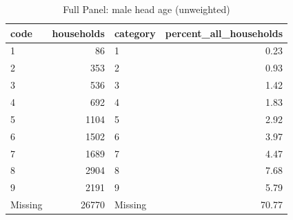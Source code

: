 \begin{table}
\caption{Full Panel: male head age (unweighted)}
\begin{tabular}{lrlr}
\toprule
code & households & category & percent\_all\_households \\
\midrule
1 & 86 & 1 & 0.23 \\
2 & 353 & 2 & 0.93 \\
3 & 536 & 3 & 1.42 \\
4 & 692 & 4 & 1.83 \\
5 & 1104 & 5 & 2.92 \\
6 & 1502 & 6 & 3.97 \\
7 & 1689 & 7 & 4.47 \\
8 & 2904 & 8 & 7.68 \\
9 & 2191 & 9 & 5.79 \\
Missing & 26770 & Missing & 70.77 \\
\bottomrule
\end{tabular}
\end{table}
